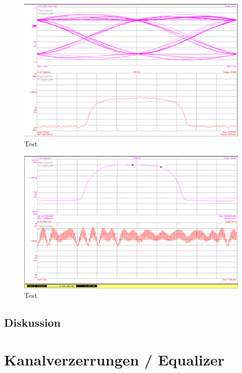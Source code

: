 \documentclass[12pt,a4paper,ngerman]{article}
\begin{document}
\begin{figure}[H]
\centering
\includegraphics[width=\textwidth]{figures/Aufgabe1_QPSK_demod_i_eye.jpg} 
\caption{Test}
\end{figure}

\begin{figure}[H]
\centering
\includegraphics[width=\textwidth]{figures/Aufgabe1_QPSK_fs.jpg} 
\caption{Test}
\end{figure}

\subsection{Diskussion}



\pagebreak



\section{Kanalverzerrungen / Equalizer}
\end{document}
